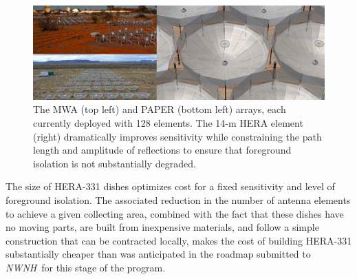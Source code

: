\documentclass[preprint]{aastex}
\def\nwnh{{\sl NWNH}}
\begin{document}
\begin{figure}[t]\centering
\includegraphics[width=6.5in]{plots/PAPER_and_MWA_and_HERA.jpg}
\caption{\small
The MWA (top left) and PAPER (bottom left) arrays, each currently deployed with 128 elements.
The 14-m HERA element (right) dramatically improves sensitivity while 
constraining the path length and amplitude of reflections to ensure that foreground
isolation is not substantially degraded.
}
\label{fig:hera_dish}
\end{figure}


The size of HERA-331 dishes optimizes cost for a fixed sensitivity and
level of foreground isolation.  The associated reduction in the number
of antenna elements to achieve a given collecting area, combined with
the fact that these dishes have no moving parts, are built from
inexpensive materials, and follow a simple construction that can be
contracted locally, makes the cost of building HERA-331 substantially
cheaper than was anticipated in the roadmap submitted to \nwnh\ for this
stage of the program.   
\end{document}

